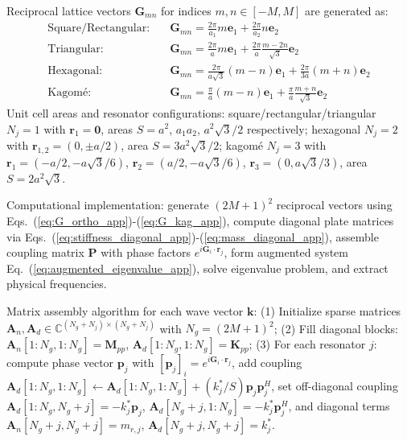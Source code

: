 \documentclass[review,numbers,sort&compress]{elsarticle}
\begin{document}
Reciprocal lattice vectors $\mathbf{G}_{mn}$ for indices $m, n \in [-M, M]$ are generated as:
\begin{align}
\text{Square/Rectangular:} \quad &\mathbf{G}_{mn} = \frac{2\pi}{a_1}m\mathbf{e}_1 + \frac{2\pi}{a_2}n\mathbf{e}_2 \label{eq:G_ortho_app}\\
\text{Triangular:} \quad &\mathbf{G}_{mn} = \frac{2\pi}{a}m\mathbf{e}_1 + \frac{2\pi}{a}\frac{m-2n}{\sqrt{3}}\mathbf{e}_2 \label{eq:G_tri_app}\\
\text{Hexagonal:} \quad &\mathbf{G}_{mn} = \frac{2\pi}{a\sqrt{3}}(m-n)\mathbf{e}_1 + \frac{2\pi}{3a}(m+n)\mathbf{e}_2 \label{eq:G_hex_app}\\
\text{Kagomé:} \quad &\mathbf{G}_{mn} = \frac{\pi}{a}(m-n)\mathbf{e}_1 + \frac{\pi}{a}\frac{m+n}{\sqrt{3}}\mathbf{e}_2 \label{eq:G_kag_app}
\end{align}
Unit cell areas and resonator configurations: square/rectangular/triangular $N_j = 1$ with $\mathbf{r}_1 = \mathbf{0}$, areas $S = a^2$, $a_1 a_2$, $a^2\sqrt{3}/2$ respectively; hexagonal $N_j = 2$ with $\mathbf{r}_{1,2} = (0, \pm a/2)$, area $S = 3a^2\sqrt{3}/2$; kagomé $N_j = 3$ with $\mathbf{r}_1 = (-a/2, -a\sqrt{3}/6)$, $\mathbf{r}_2 = (a/2, -a\sqrt{3}/6)$, $\mathbf{r}_3 = (0, a\sqrt{3}/3)$, area $S = 2a^2\sqrt{3}$.

Computational implementation: generate $(2M+1)^2$ reciprocal vectors using Eqs.~(\ref{eq:G_ortho_app})-(\ref{eq:G_kag_app}), compute diagonal plate matrices via Eqs.~(\ref{eq:stiffness_diagonal_app})-(\ref{eq:mass_diagonal_app}), assemble coupling matrix $\mathbf{P}$ with phase factors $e^{i\mathbf{G}_i \cdot \mathbf{r}_j}$, form augmented system Eq.~(\ref{eq:augmented_eigenvalue_app}), solve eigenvalue problem, and extract physical frequencies.

Matrix assembly algorithm for each wave vector $\mathbf{k}$: (1) Initialize sparse matrices $\mathbf{A}_n, \mathbf{A}_d \in \mathbb{C}^{(N_g+N_j) \times (N_g+N_j)}$ with $N_g = (2M+1)^2$; (2) Fill diagonal blocks: $\mathbf{A}_n[1:N_g, 1:N_g] = \mathbf{M}_{pp}$, $\mathbf{A}_d[1:N_g, 1:N_g] = \mathbf{K}_{pp}$; (3) For each resonator $j$: compute phase vector $\mathbf{p}_j$ with $[\mathbf{p}_j]_i = e^{i\mathbf{G}_i \cdot \mathbf{r}_j}$, add coupling $\mathbf{A}_d[1:N_g, 1:N_g] \leftarrow \mathbf{A}_d[1:N_g, 1:N_g] + (k_j^*/S)\mathbf{p}_j\mathbf{p}_j^H$, set off-diagonal coupling $\mathbf{A}_d[1:N_g, N_g+j] = -k_j^*\mathbf{p}_j$, $\mathbf{A}_d[N_g+j, 1:N_g] = -k_j^*\mathbf{p}_j^H$, and diagonal terms $\mathbf{A}_n[N_g+j, N_g+j] = m_{r,j}$, $\mathbf{A}_d[N_g+j, N_g+j] = k_j^*$.
\end{document}
